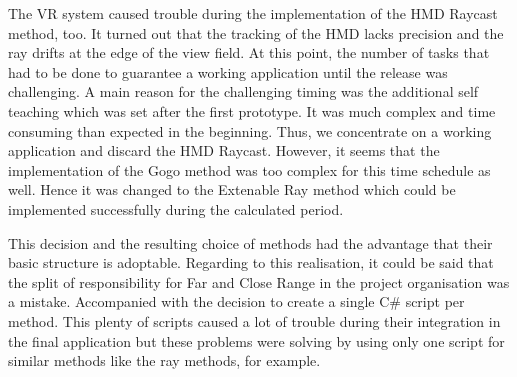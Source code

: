 The VR system caused trouble during the implementation of the HMD Raycast method, too. It turned out that the tracking of the HMD lacks precision and the ray drifts at the edge of the view field. At this point, the number of tasks that had to be done to guarantee a working application until the release was challenging. A main reason for the challenging timing was the additional self teaching which was set after the first prototype. It was much complex and time consuming than expected in the beginning. Thus, we concentrate on a working application and discard the HMD Raycast. However, it seems that the implementation of the Gogo method was too complex for this time schedule as well. Hence it was changed to the Extenable Ray method which could be implemented successfully during the calculated period. 

This decision and the resulting choice of methods had the advantage that their basic structure is adoptable. Regarding to this realisation, it could be said that the split of responsibility for Far and Close Range in the project organisation was a mistake. Accompanied with the decision to create a single C\# script per method. This plenty of scripts caused a lot of trouble during their integration in the final application but these problems were solving by using only one script for similar methods like the ray methods, for example.

\newpage

























